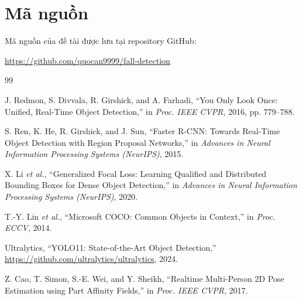 \documentclass[12pt, a4paper]{article}
\begin{document}
\section{Mã nguồn}

Mã nguồn của đề tài được lưu tại repository GitHub:
\begin{center}
  \url{https://github.com/quocan9999/fall-detection}
\end{center}

\newpage
\begin{thebibliography}{99}

J. Redmon, S. Divvala, R. Girshick, and A. Farhadi,
``You Only Look Once: Unified, Real-Time Object Detection,''
in \textit{Proc. IEEE CVPR}, 2016, pp. 779--788.

S. Ren, K. He, R. Girshick, and J. Sun,
``Faster R-CNN: Towards Real-Time Object Detection with Region Proposal Networks,''
in \textit{Advances in Neural Information Processing Systems (NeurIPS)}, 2015.

X. Li \textit{et al.},
``Generalized Focal Loss: Learning Qualified and Distributed Bounding Boxes for Dense Object Detection,''
in \textit{Advances in Neural Information Processing Systems (NeurIPS)}, 2020.

T.-Y. Lin \textit{et al.},
``Microsoft COCO: Common Objects in Context,''
in \textit{Proc. ECCV}, 2014.

Ultralytics,
``YOLO11: State-of-the-Art Object Detection,''
\url{https://github.com/ultralytics/ultralytics}, 2024.

Z. Cao, T. Simon, S.-E. Wei, and Y. Sheikh,
``Realtime Multi-Person 2D Pose Estimation using Part Affinity Fields,''
in \textit{Proc. IEEE CVPR}, 2017.

\end{thebibliography}
\end{document}
